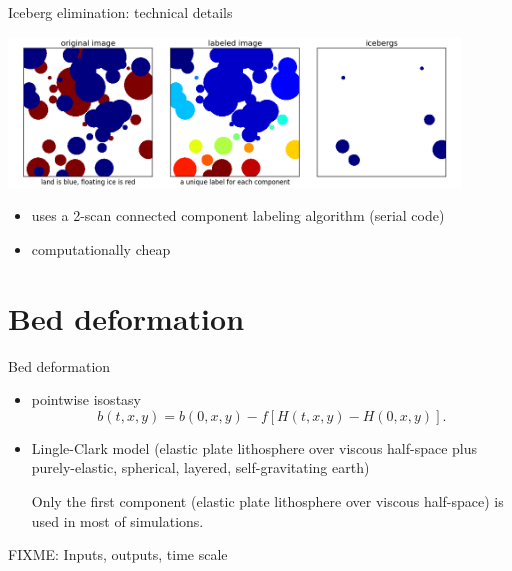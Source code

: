 \documentclass[hide notes,intlimits]{beamer}
\begin{document}
\begin{frame}{Iceberg elimination: technical details}

  \begin{center}
    \includegraphics[width=0.9\textwidth]{icebergs.png}
  \end{center}

  \begin{itemize}
  \item uses a 2-scan connected component labeling algorithm (serial code)
  \item computationally cheap
  \end{itemize}
\end{frame}

\section{Bed deformation}
\label{sec:bed-deformation}

\begin{frame}{Bed deformation}
  \begin{itemize}
  \item pointwise isostasy
    \begin{equation}
      \label{eq:9}
      b(t,x,y) = b(0,x,y) - f \left[H(t,x,y) - H(0,x,y)\right].
    \end{equation}
  \item Lingle-Clark model (elastic plate lithosphere over viscous
    half-space plus purely-elastic, spherical, layered,
    self-gravitating earth)

    \medskip
    Only the first component (elastic plate lithosphere over viscous
    half-space) is used in most of simulations.
  \end{itemize}

  FIXME: Inputs, outputs, time scale
\end{frame}
\end{document}
